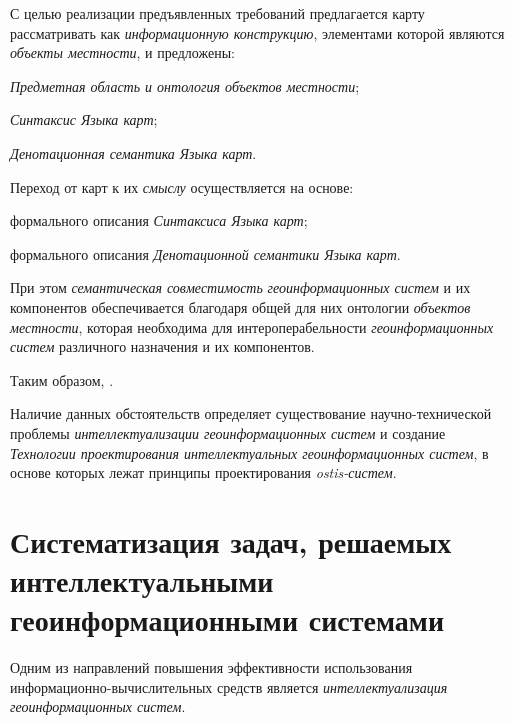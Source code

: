 С целью реализации предъявленных требований предлагается карту рассматривать как \textit{информационную конструкцию}, элементами которой являются \textit{объекты местности}, и предложены:
\begin{textitemize}
	\item \textit{Предметная область и онтология объектов местности};
	\item \textit{Синтаксис Языка карт}; 
	\item \textit{Денотационная семантика Языка карт}.
\end{textitemize}

Переход от карт к их \textit{смыслу} осуществляется на основе:
\begin{textitemize}
	\item формального описания \textit{Синтаксиса Языка карт};
	\item формального описания \textit{Денотационной семантики Языка карт}.
\end{textitemize}

При этом \textit{семантическая совместимость} \textit{геоинформационных систем} и их компонентов обеспечивается благодаря общей для них онтологии \textit{объектов местности}, которая необходима для интероперабельности \textit{геоинформационных систем} различного назначения и их компонентов.

Таким образом,  .

Наличие данных обстоятельств определяет существование научно-технической проблемы \textit{интеллектуализации геоинформационных систем} и создание \textit{Технологии проектирования интеллектуальных геоинформационных систем}, в основе которых лежат принципы проектирования \textit{ostis-систем}.

\section{Систематизация задач, решаемых интеллектуальными геоинформационными системами}
\label{chapter_gis_sec_tasks}

Одним из направлений повышения эффективности использования информационно-вычислительных средств является \textit{интеллектуализация геоинформационных систем}.

